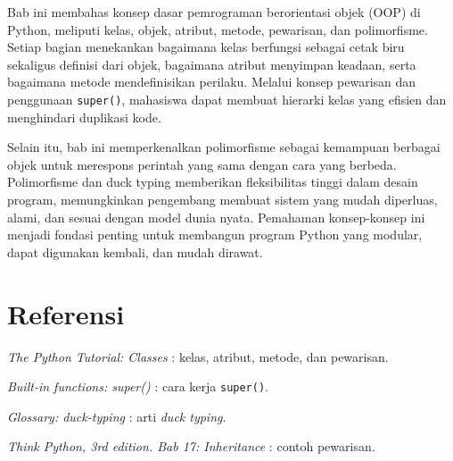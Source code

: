 Bab ini membahas konsep dasar pemrograman berorientasi objek (OOP) di Python, meliputi kelas, objek, atribut, metode, pewarisan, dan polimorfisme. Setiap bagian menekankan bagaimana kelas berfungsi sebagai cetak biru sekaligus definisi dari objek, bagaimana atribut menyimpan keadaan, serta bagaimana metode mendefinisikan perilaku. Melalui konsep pewarisan dan penggunaan \texttt{super()}, mahasiswa dapat membuat hierarki kelas yang efisien dan menghindari duplikasi kode.

Selain itu, bab ini memperkenalkan polimorfisme sebagai kemampuan berbagai objek untuk merespons perintah yang sama dengan cara yang berbeda. Polimorfisme dan duck typing memberikan fleksibilitas tinggi dalam desain program, memungkinkan pengembang membuat sistem yang mudah diperluas, alami, dan sesuai dengan model dunia nyata. Pemahaman konsep-konsep ini menjadi fondasi penting untuk membangun program Python yang modular, dapat digunakan kembali, dan mudah dirawat.

\section*{Referensi}
\begin{daftarrapat}
  \item \textit{The Python Tutorial: Classes} \cite{py-tut-classes}: kelas, atribut, metode, dan pewarisan.
  \item \textit{Built-in functions: super()} \cite{py-functions-super}: cara kerja \texttt{super()}.
  \item \textit{Glossary: duck-typing} \cite{py-glossary-duck}: arti \textit{duck typing}.
  \item \textit{Think Python, 3rd edition. Bab 17: Inheritance} \cite{thinkpython-ch17}: contoh pewarisan.
\end{daftarrapat}
